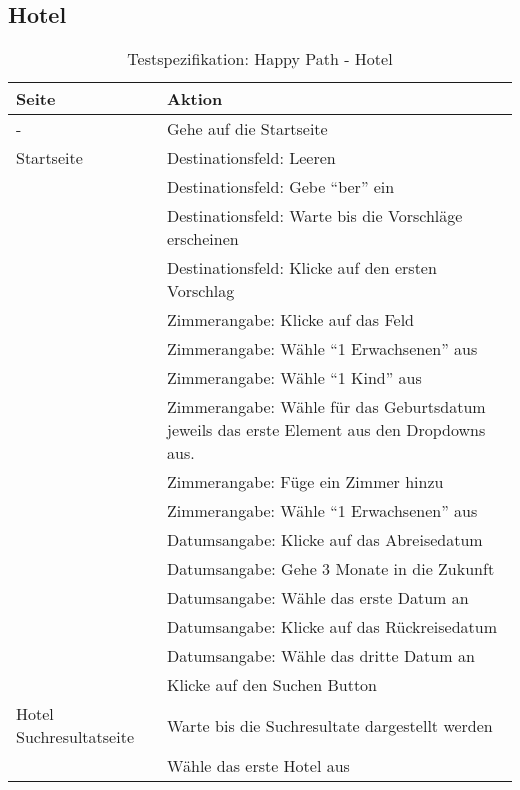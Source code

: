 \subsection{Hotel}
\begin{table}[H] 
	\caption{Testspezifikation: Happy Path - Hotel}
	\centering
		
	\begin{tabularx}{0.9\textwidth}{ | l | X | } 
		\hline 
		\textbf{Seite} & \textbf{Aktion} \\ \hline 
		\multirow{1}{*}{-} & Gehe auf die Startseite \\ \hline
		\multirow{1}{*}{Startseite} & Destinationsfeld: Leeren \\ \cline{2-2}
		& Destinationsfeld: Gebe "`ber"' ein \\ \cline{2-2}
		& Destinationsfeld: Warte bis die Vorschläge erscheinen \\ \cline{2-2}
		& Destinationsfeld: Klicke auf den ersten Vorschlag \\ \cline{2-2}
		& Zimmerangabe: Klicke auf das Feld \\ \cline{2-2}
		& Zimmerangabe: Wähle "`1 Erwachsenen"' aus \\ \cline{2-2}
		& Zimmerangabe: Wähle "`1 Kind"' aus \\ \cline{2-2}
		& Zimmerangabe: Wähle für das Geburtsdatum jeweils das erste Element aus den Dropdowns aus.  \\ \cline{2-2}
		& Zimmerangabe: Füge ein Zimmer hinzu \\ \cline{2-2}
		& Zimmerangabe: Wähle "`1 Erwachsenen"' aus \\ \cline{2-2}
		& Datumsangabe: Klicke auf das Abreisedatum \\ \cline{2-2}
		& Datumsangabe: Gehe 3 Monate in die Zukunft \\ \cline{2-2}
		& Datumsangabe: Wähle das erste Datum an \\ \cline{2-2}
		& Datumsangabe: Klicke auf das Rückreisedatum \\ \cline{2-2}
		& Datumsangabe: Wähle das dritte Datum an \\ \cline{2-2}
		& Klicke auf den Suchen Button \\ \hline
		
		\multirow{1}{*}{Hotel Suchresultatseite} & Warte bis die Suchresultate dargestellt werden \\ \cline{2-2}
		& Wähle das erste Hotel aus \\ \hline
		

\end{tabularx}
\end{table}
